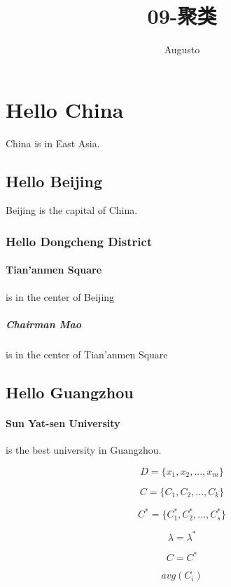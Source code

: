 \documentclass{article}
\title{09-聚类}
\author {Augusto}
\begin{document}
   \maketitle
   \section{Hello China} China is in East Asia.
     \subsection{Hello Beijing} Beijing is the capital of China.
       \subsubsection{Hello Dongcheng District}
         \paragraph{Tian'anmen Square}is in the center of Beijing
           \subparagraph{Chairman Mao} is in the center of Tian'anmen Square
       \subsection{Hello Guangzhou}
         \paragraph{Sun Yat-sen University} is the best university in Guangzhou.

\begin{equation}\label{D}
D = \{x_1, x_2, ..., x_m\}
\end{equation}

\begin{equation}\label{C}
C = \{C_1, C_2, ..., C_k\}
\end{equation}

\begin{equation}\label{start}
C^{*} = \{C_1^{*}, C_2^{*}, ..., C_s^{*}\}
\end{equation}

\begin{equation}\label{lambda}
\lambda = \lambda^{*}
\end{equation}

\begin{equation}\label{c2}
C = C^{*}
\end{equation}

\begin{equation}\label{avg}
avg(C_i)
\end{equation}
\end{document}
